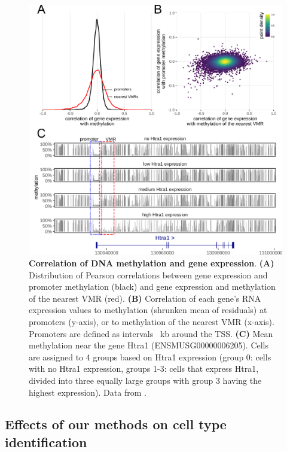 \documentclass[twocolumn,10pt]{article}
\begin{document}
\begin{figure}
    \begin{center}
    \includegraphics[width=.95\columnwidth]{figures/Fig_correlation.png}
    \end{center}
    \caption{\small \textbf{Correlation of DNA methylation and gene expression}.
    \textbf{(A)} Distribution of Pearson correlations between gene expression and promoter methylation (black) and gene expression and methylation of the nearest VMR (red).
    \textbf{(B)} Correlation of each gene's RNA expression values to methylation (shrunken mean of residuals) at promoters (y-axis), or to methylation of the nearest VMR (x-axis).
    Promoters are defined as intervals ~kb around the TSS.
    \textbf{(C)} Mean methylation near the gene Htra1 (ENSMUSG00000006205).
    Cells are assigned to 4 groups based on Htra1 expression (group 0: cells with no Htra1 expression, groups 1-3: cells that express Htra1, divided into three equally large groups with group 3 having the highest expression).
    Data from \citet{kremer_scnmt}.}
    \label{fig:correlation}
\end{figure}


\subsection{Effects of our methods on cell type identification}
\end{document}
